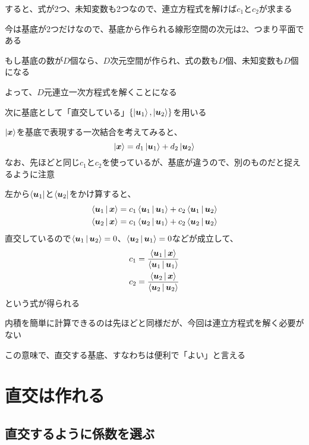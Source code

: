 \documentclass[../book_half_step_linear]{subfiles}
\begin{document}
すると、式が2つ、未知変数も2つなので、連立方程式を解けば$c_1$と$c_2$が求まる

\br

今は基底が2つだけなので、基底から作られる線形空間の次元は2、つまり平面である

もし基底の数が$D$個なら、$D$次元空間が作られ、式の数も$D$個、未知変数も$D$個になる

よって、$D$元連立一次方程式を解くことになる

\sectionline

次に基底として「直交している」$\left\{ \ket{\vb*{u}_1}, \ket{\vb*{u}_2} \right\}$を用いる

$\ket{\vb*{x}}$を基底で表現する一次結合を考えてみると、
\begin{equation*}
  \ket{\vb*{x}} = d_1 \ket{\vb*{u}_1} + d_2 \ket{\vb*{u}_2}
\end{equation*}
なお、先ほどと同じ$c_1$と$c_2$を使っているが、基底が違うので、別のものだと捉えるように注意

\br

左から$\bra{\vb*{u}_1}$と$\bra{\vb*{u}_2}$をかけ算すると、
\begin{align*}
  \Braket{\vb*{u}_1|\vb*{x}} & = c_1 \Braket{\vb*{u}_1|\vb*{u}_1} + c_2 \Braket{\vb*{u}_1|\vb*{u}_2} \\
  \Braket{\vb*{u}_2|\vb*{x}} & = c_1 \Braket{\vb*{u}_2|\vb*{u}_1} + c_2 \Braket{\vb*{u}_2|\vb*{u}_2}
\end{align*}
直交しているので$\Braket{\vb*{u}_1|\vb*{u}_2} = 0$、$\Braket{\vb*{u}_2|\vb*{u}_1} = 0$などが成立して、
\begin{align*}
  c_1 & = \frac{\Braket{\vb*{u}_1|\vb*{x}}}{\Braket{\vb*{u}_1|\vb*{u}_1}} \\
  c_2 & = \frac{\Braket{\vb*{u}_2|\vb*{x}}}{\Braket{\vb*{u}_2|\vb*{u}_2}}
\end{align*}
という式が得られる

内積を簡単に計算できるのは先ほどと同様だが、今回は連立方程式を解く必要がない

この意味で、直交する基底、すなわちは便利で「よい」と言える

\section{直交は作れる}

\subsection{直交するように係数を選ぶ}
\end{document}

